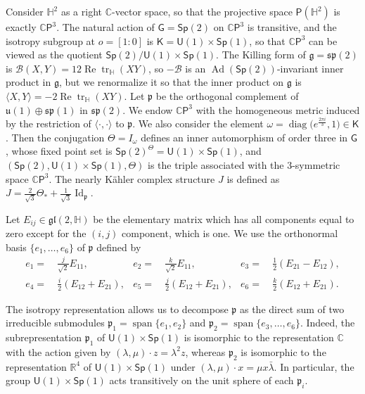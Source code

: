 \documentclass[11pt,a4paper,final]{amsart}
\newcommand{\s}{\mathsf}
\newcommand{\g}{\mathfrak}
\newcommand{\R}{\mathbb{R}}
\newcommand{\Ad}{\operatorname{Ad}}
\newcommand{\C}{\mathbb{C}}
\newcommand{\vecspan}{\operatorname{span}}
\renewcommand{\H}{\mathbb{H}}
\theoremstyle{definition}
\begin{document}
Consider $\mathbb{H}^{2}$ as a right $\C$-vector space, so that the projective space $\mathsf{P}(\mathbb{H}^{2})$ is exactly $\C\mathsf{P}^{3}$.
The natural action of $\s{G}=\mathsf{Sp}(2)$ on $\C\mathsf{P}^{3}$ is transitive, and the isotropy subgroup at $o=[1:0]$ is $\s{K}=\mathsf{U}(1)\times\mathsf{Sp}(1)$, so that $\C\mathsf{P}^{3}$ can be viewed as the quotient $\mathsf{Sp}(2)/\mathsf{U}(1)\times\mathsf{Sp}(1)$.
The Killing form of $\g{g}=\g{sp}(2)$ is $\mathcal{B}(X,Y)=12\operatorname{Re}\operatorname{tr}_{\mathbb{H}}(XY)$, so $-\mathcal{B}$ is an $\Ad(\mathsf{Sp}(2))$-invariant inner product in $\g{g}$,
but we renormalize it so that the inner product on $\g{g}$ is $\langle X,Y\rangle = -2\operatorname{Re}\operatorname{tr}_{\mathbb{H}}(XY)$.
Let $\g{p}$ be the orthogonal complement of $\g{u}(1)\oplus\g{sp}(1)$ in $\g{sp}(2)$.
We endow $\C\mathsf{P}^{3}$ with the homogeneous metric induced by the restriction of $\langle \cdot, \cdot \rangle$ to $\g{p}$.
We also consider the element $\omega=\operatorname{diag}\bigl(e^\frac{2\pi i}{3},1\bigr)\in\s{K}$.
Then the conjugation $\Theta=I_{\omega}$ defines an inner automorphism of order three in $\mathsf{G}$, whose fixed point set is $\mathsf{Sp}(2)^{\Theta}=\mathsf{U}(1)\times\mathsf{Sp}(1)$, and $(\mathsf{Sp}(2),\mathsf{U}(1)\times\mathsf{Sp}(1),\Theta)$ is the triple associated with the $3$-symmetric space $\C\mathsf{P}^{3}$.
The nearly Kähler complex structure $J$ is defined as $J=\frac{2}{\sqrt{3}}\Theta_{*}+\frac{1}{\sqrt{3}}\operatorname{Id}_{\g{p}}$.

Let $E_{ij}\in\g{gl}(2,\H)$ be the elementary matrix which has all components equal to zero except for the $(i,j)$ component, which is one.
We use the orthonormal basis $\{e_{1},\dots,e_{6}\}$ of $\g{p}$ defined by
\begin{align*}
	e_{1}=&~\frac{j}{\sqrt{2}}E_{11}, & e_{2}=&~\frac{k}{\sqrt{2}}E_{11}, & e_{3}=&~\frac{1}{2}(E_{21}-E_{12}), \\
	e_{4}=&~\frac{i}{2}(E_{12}+E_{21}), & e_{5}=&~\frac{j}{2}(E_{12}+E_{21}), & e_{6}=&~\frac{k}{2}(E_{12}+E_{21}).
\end{align*}
	
The isotropy representation allows us to decompose $\g{p}$ as the direct sum of two irreducible submodules $\g{p}_{1}=\vecspan\{e_{1},e_{2}\}$ and $\g{p}_{2}=\vecspan\{e_{3},\dots,e_{6}\}$.
Indeed, the subrepresentation $\g{p}_{1}$ of $\mathsf{U}(1)\times\mathsf{Sp}(1)$ is isomorphic to the representation $\C$ with the action given by $(\lambda,\mu)\cdot z=\lambda^{2}z$, whereas $\g{p}_{2}$ is isomorphic to the representation $\R^{4}$ of $\mathsf{U}(1)\times\mathsf{Sp}(1)$ under $(\lambda,\mu)\cdot x=\mu x \bar{\lambda}$.
In particular, the group $\s{U}(1)\times\s{Sp}(1)$ acts transitively on the unit sphere of each $\g{p}_{i}$.
	
\end{document}

